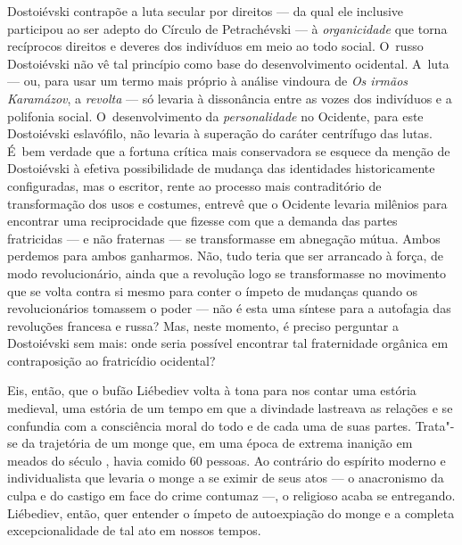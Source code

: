 Dostoiévski contrapõe a luta secular por direitos --- da qual ele
inclusive participou ao ser adepto do Círculo de Petrachévski --- à
\emph{organicidade} que torna recíprocos direitos e deveres dos
indivíduos em meio ao todo social. O~russo Dostoiévski não vê tal
princípio como base do desenvolvimento ocidental. A~luta --- ou, para
usar um termo mais próprio à análise vindoura de \emph{Os irmãos
Karamázov}, a \emph{revolta} --- só levaria à dissonância entre as vozes
dos indivíduos e a polifonia social. O~desenvolvimento da
\emph{personalidade} no Ocidente, para este Dostoiévski eslavófilo, não
levaria à superação do caráter centrífugo das lutas. É~bem verdade que a
fortuna crítica mais conservadora se esquece da menção de Dostoiévski à
efetiva possibilidade de mudança das identidades historicamente
configuradas, mas o escritor, rente ao processo mais contraditório de
transformação dos usos e costumes, entrevê que o Ocidente levaria
milênios para encontrar uma reciprocidade que fizesse com que a demanda
das partes fratricidas --- e não fraternas --- se transformasse em
abnegação mútua. Ambos perdemos para ambos ganharmos. Não, tudo teria
que ser arrancado à força, de modo revolucionário, ainda que a revolução
logo se transformasse no movimento que se volta contra si mesmo para
conter o ímpeto de mudanças quando os revolucionários tomassem o poder
--- não é esta uma síntese para a autofagia das revoluções francesa e
russa? Mas, neste momento, é preciso perguntar a Dostoiévski sem mais:
onde seria possível encontrar tal fraternidade orgânica em contraposição
ao fratricídio ocidental?

Eis, então, que o bufão Liébediev volta à tona para nos contar uma
estória medieval, uma estória de um tempo em que a divindade lastreava
as relações e se confundia com a consciência moral do todo e de cada uma
de suas partes. Trata"-se da trajetória de um monge que, em uma época de
extrema inanição em meados do século , havia comido 60 pessoas. Ao
contrário do espírito moderno e individualista que levaria o monge a se
eximir de seus atos --- o anacronismo da culpa e do castigo em face do
crime contumaz ---, o religioso acaba se entregando. Liébediev, então,
quer entender o ímpeto de autoexpiação do monge e a completa
excepcionalidade de tal ato em nossos tempos.

